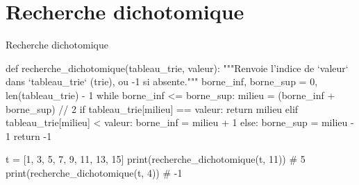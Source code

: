 \section{Recherche dichotomique}



\begin{codereference}{Recherche dichotomique}
\begin{python}
def recherche_dichotomique(tableau_trie, valeur):
    """Renvoie l'indice de `valeur` dans `tableau_trie` (trie), ou -1 si absente."""
    borne_inf, borne_sup = 0, len(tableau_trie) - 1
    while borne_inf <= borne_sup:
        milieu = (borne_inf + borne_sup) // 2
        if tableau_trie[milieu] == valeur:
            return milieu
        elif tableau_trie[milieu] < valeur:
            borne_inf = milieu + 1
        else:
            borne_sup = milieu - 1
    return -1

t = [1, 3, 5, 7, 9, 11, 13, 15]
print(recherche_dichotomique(t, 11))  # 5
print(recherche_dichotomique(t, 4))   # -1
\end{python}
\end{codereference}


